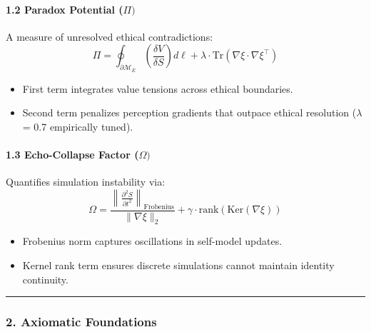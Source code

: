 \documentclass[
]{article}
\providecommand{\tightlist}{%
  \setlength{\itemsep}{0pt}\setlength{\parskip}{0pt}}
\begin{document}
\paragraph{\texorpdfstring{\textbf{1.2 Paradox Potential
(\(\Pi )\)}}{1.2 Paradox Potential (\textbackslash Pi )}}\label{paradox-potential-ux3c0}

A measure of unresolved ethical contradictions:\\
\[
\Pi = \oint_{\partial \mathcal{M}_E} \left( \frac{\delta V}{\delta S} \right) d\ell + \lambda \cdot \text{Tr}(\nabla\xi \cdot \nabla\xi^\top)
\]

\begin{itemize}
\tightlist
\item
  First term integrates value tensions across ethical boundaries.\\
\item
  Second term penalizes perception gradients that outpace ethical
  resolution (\(\lambda \) = 0.7 empirically tuned).
\end{itemize}

\paragraph{\texorpdfstring{\textbf{1.3 Echo-Collapse Factor
(\(\Omega )\)}}{1.3 Echo-Collapse Factor (\textbackslash Omega )}}\label{echo-collapse-factor-ux3c9}

Quantifies simulation instability via:\\
\[
\Omega = \frac{\left\|\frac{\partial^2 S}{\partial t^2}\right\|_{\text{Frobenius}}}{\|\nabla\xi\|_2} + \gamma \cdot \text{rank}(\text{Ker}(\nabla\xi))
\]

\begin{itemize}
\tightlist
\item
  Frobenius norm captures oscillations in self-model updates.\\
\item
  Kernel rank term ensures discrete simulations cannot maintain identity
  continuity.
\end{itemize}

\begin{center}\rule{0.5\linewidth}{0.5pt}\end{center}

\subsubsection{\texorpdfstring{\textbf{2. Axiomatic
Foundations}}{2. Axiomatic Foundations}}\label{axiomatic-foundations-1}
\end{document}
